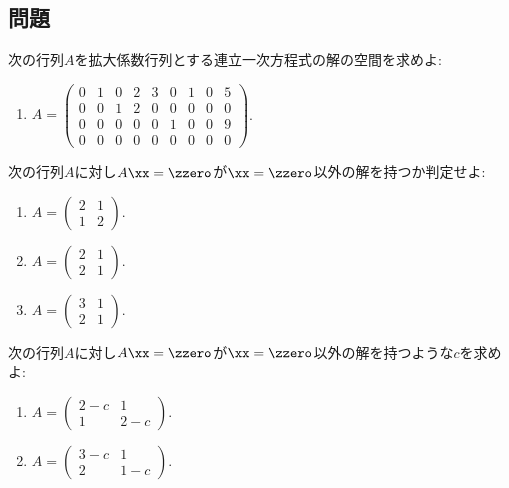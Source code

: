 \subsection{問題}
\begin{quiz}
  次の行列$A$を拡大係数行列とする連立一次方程式の解の空間を求めよ:
  \begin{enumerate}
  \item $A=\begin{pmatrix}0&1&0&2&3&0&1&0&5\\0&0&1&2&0&0&0&0&0\\0&0&0&0&0&1&0&0&9\\0&0&0&0&0&0&0&0&0\end{pmatrix}$.
  \end{enumerate}
\end{quiz}
\begin{quiz}
  次の行列$A$に対し$A\xx=\zzero$が$\xx=\zzero$以外の解を持つか判定せよ:
  \begin{enumerate}
  \item $A=\begin{pmatrix}2&1\\1&2\end{pmatrix}$.
  \item $A=\begin{pmatrix}2&1\\2&1\end{pmatrix}$.
  \item $A=\begin{pmatrix}3&1\\2&1\end{pmatrix}$.
  \end{enumerate}
\end{quiz}

\begin{quiz}
  次の行列$A$に対し$A\xx=\zzero$が$\xx=\zzero$以外の解を持つような$c$を求めよ:
  \begin{enumerate}
  \item $A=\begin{pmatrix}2-c&1\\1&2-c\end{pmatrix}$.
  \item $A=\begin{pmatrix}3-c&1\\2&1-c\end{pmatrix}$.
  \end{enumerate}
\end{quiz}

